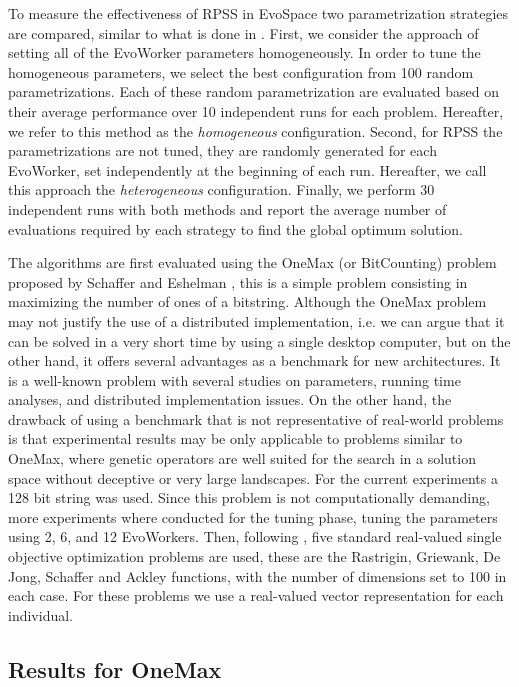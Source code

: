 \documentclass[graybox]{svmult}
\begin{document}
To measure the effectiveness of RPSS in EvoSpace two parametrization strategies are compared,
similar to what is done in \cite{fuku1,fuku2,garcia2014randomized}. First, we consider the approach of setting all
of the EvoWorker parameters homogeneously. In order to tune the homogeneous parameters,
we select the best configuration from 100 random parametrizations.
Each of these random parametrization are evaluated based on their average performance over 10
independent runs for each problem.
Hereafter, we refer to this method as the {\em homogeneous} configuration.
Second, for RPSS the parametrizations
are not tuned, they are randomly generated for each EvoWorker, set independently at the beginning of each run.
Hereafter, we call this approach the {\em heterogeneous} configuration. Finally, we perform 30 independent runs
with both methods and report the average number of evaluations required by each strategy to find the
global optimum solution.

The algorithms are first evaluated using the OneMax (or BitCounting) problem proposed by
Schaffer and Eshelman \cite{SE91}, this is a simple problem consisting in maximizing the number
of ones of a bitstring. Although the OneMax problem may not justify the use of a distributed
implementation, i.e. we can argue that it can be solved in a very short time by using a
single desktop computer, but on the other hand, it offers several advantages as a
benchmark for new architectures. It is a well-known problem with several
studies on parameters,  running time analyses, and distributed implementation
issues. On the other hand, the drawback of using a benchmark that is not representative of
real-world problems is that experimental results may be only applicable to
problems similar to OneMax, where genetic operators are well suited for the
search in a solution space without deceptive or very large landscapes.
For the current experiments a 128 bit string was used. Since this
problem is not computationally demanding, more experiments where conducted for the tuning phase,
tuning the parameters using 2, 6, and 12 EvoWorkers. Then, following \cite{fuku1},
five standard real-valued single objective optimization problems
are used, these are the Rastrigin, Griewank, De Jong, Schaffer  and Ackley functions,
with the number of dimensions set to 100 in each case. For these problems we use a real-valued vector
representation for each individual.

\subsection{Results for OneMax}
\end{document}
